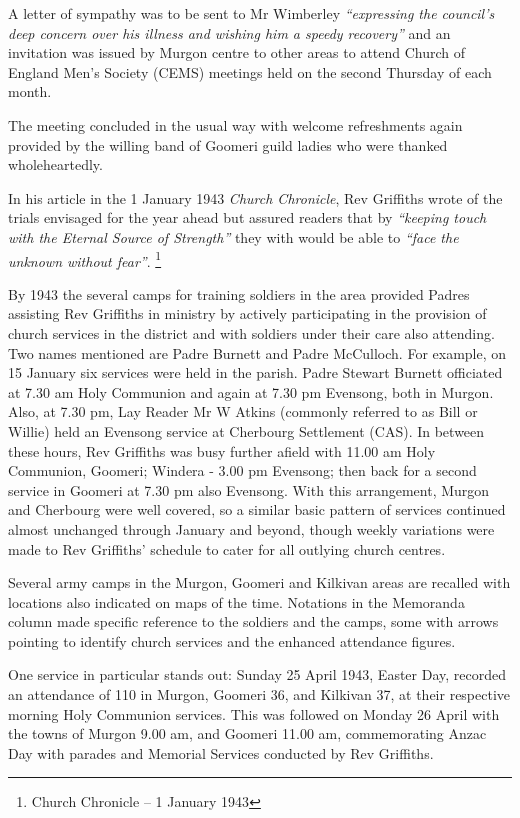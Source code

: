 A letter of sympathy was to be sent to Mr Wimberley \emph{``expressing the council's deep concern over his illness and wishing him a speedy recovery''} and an invitation was issued by Murgon centre to other areas to attend Church of England Men's Society (CEMS) meetings held on the second Thursday of each month.



The meeting concluded in the usual way with welcome refreshments again provided by the willing band of Goomeri guild ladies who were thanked wholeheartedly.



In his article in the 1 January 1943 \emph{Church Chronicle}, Rev Griffiths wrote of the trials envisaged for the year ahead but assured readers that by \emph{``keeping touch with the Eternal Source of Strength''} they with would be able to \emph{``face the unknown without fear''}. \footnote{Church Chronicle -- 1 January 1943}


By 1943 the several camps for training soldiers in the area provided Padres assisting Rev Griffiths in ministry by actively participating in the provision of church services in the district and with soldiers under their care also attending. Two names mentioned are Padre Burnett and Padre McCulloch. For example, on 15 January six services were held in the parish. Padre Stewart Burnett officiated at 7.30 am Holy Communion and again at 7.30 pm Evensong, both in Murgon. Also, at 7.30 pm, Lay Reader Mr W Atkins (commonly referred to as Bill or Willie) held an Evensong service at Cherbourg Settlement (CAS). In between these hours, Rev Griffiths was busy further afield with 11.00 am Holy Communion, Goomeri; Windera - 3.00 pm Evensong; then back for a second service in Goomeri at 7.30 pm also Evensong. With this arrangement, Murgon and Cherbourg were well covered, so a similar basic pattern of services continued almost unchanged through January and beyond, though weekly variations were made to Rev Griffiths' schedule to cater for all outlying church centres.



Several army camps in the Murgon, Goomeri and Kilkivan areas are recalled with locations also indicated on maps of the time. Notations in the Memoranda column made specific reference to the soldiers and the camps, some with arrows pointing to identify church services and the enhanced attendance figures.



One service in particular stands out: Sunday 25 April 1943, Easter Day, recorded an attendance of 110 in Murgon, Goomeri 36, and Kilkivan 37, at their respective morning Holy Communion services. This was followed on Monday 26 April with the towns of Murgon 9.00 am, and Goomeri 11.00 am, commemorating Anzac Day with parades and Memorial Services conducted by Rev Griffiths.



